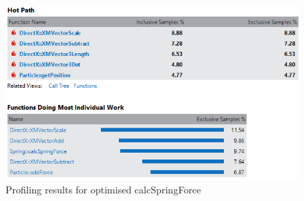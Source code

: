 \begin{landscape}
    \begin{figure}[!htb]
    \begin{center}
      \includegraphics[scale=1.0]{Figures/calcspringforce_profiling_after}
    \end{center}
    \caption{Profiling results for optimised calcSpringForce}
    \label{fig:profiling4}
  \end{figure}
\end{landscape}

